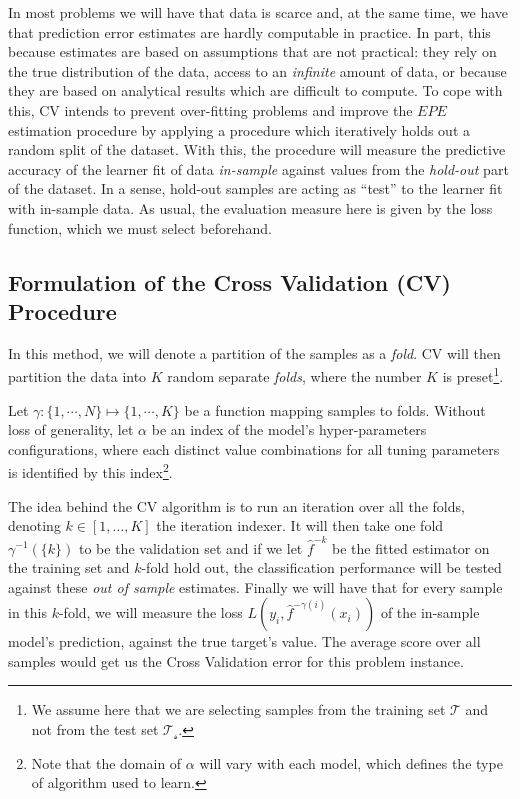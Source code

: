 %

In most problems we will have that data is scarce and, at the same time, we have that prediction error estimates are hardly computable in practice.
In part, this because estimates are based on assumptions that are not practical: they rely on the true distribution of the data, access to an \textit{infinite} amount of data, or because they are based on analytical results which are difficult to compute.
To cope with this, CV intends to prevent over-fitting problems and improve the $EPE$ estimation procedure by applying a procedure which iteratively holds out a random split of the dataset.
With this, the procedure will measure the predictive accuracy of the learner fit of data \textit{in-sample} against values from the \textit{hold-out} part of the dataset.
In a sense, hold-out samples are acting as ``test''  to the learner fit with in-sample data.
As usual, the evaluation measure here is given by the loss function, which we must select beforehand.

\subsection{Formulation of the Cross Validation (CV) Procedure}\label{subsection:crossValidationProcedure}

In this method, we will denote a partition of the samples as a \textit{fold}.
CV will then partition the data into $K$ random separate \textit{folds}, where the number $K$ is preset\footnote{ We assume here that we are selecting samples from the training set $\mathcal{T}$ and not from the test set $\mathcal{T_s}$.}.

Let $\gamma : \{1,\cdots ,N\} \mapsto \{1, \cdots , K\}$ be a function mapping samples to folds.
Without loss of generality, let $\alpha$ be an index of the model's hyper-parameters configurations, where each distinct value combinations for all tuning parameters is identified by this index\footnote{ Note that the domain of $\alpha$ will vary with each model, which defines the type of algorithm used to learn.}.

The idea behind the CV algorithm is to run an iteration over all the folds, denoting $k \in [1,\ldots,K]$ the iteration indexer.
It will then take one fold $\gamma^{-1}(\{k\})$ to be the validation set and if we let $\hat{f}^{-k}$ be the fitted estimator on the training set and $k$-fold hold out, the classification performance will be tested against these \textit{out of sample} estimates.
Finally we will have that for every sample in this $k$-fold, we will measure the loss $L(y_i, \hat{f}^{-\gamma(i)}(x_i))$ of the in-sample model's prediction, against the true target's value.
The average score over all samples would get us the Cross Validation error for this problem instance.

